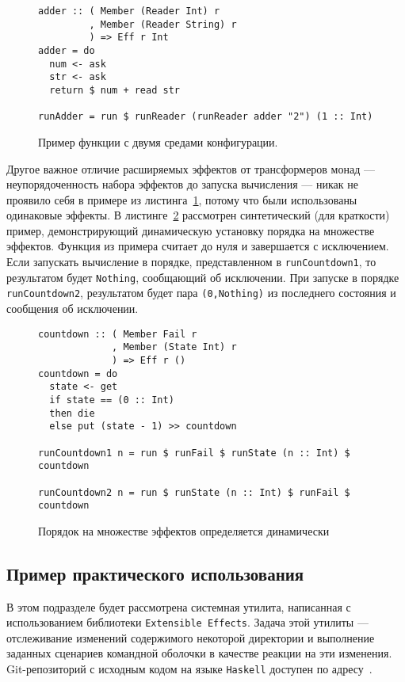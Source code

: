 \begin{figure}[t]
\begin{lstlisting}
adder :: ( Member (Reader Int) r
         , Member (Reader String) r
         ) => Eff r Int
adder = do
  num <- ask
  str <- ask
  return $ num + read str

runAdder = run $ runReader (runReader adder "2") (1 :: Int)
\end{lstlisting}
\caption{Пример функции с двумя средами конфигурации.}
\label{listing:extEff2Readers}
\end{figure}

Другое важное отличие расширяемых эффектов от трансформеров монад ---
неупорядоченность набора эффектов до запуска вычисления --- никак не проявило
себя в примере из листинга~\ref{listing:extEff2Readers}, потому что были
использованы одинаковые эффекты. В листинге~\ref{listing:extEffOrdering}
рассмотрен синтетический (для краткости) пример, демонстрирующий динамическую
установку порядка на множестве эффектов. Функция из примера считает до нуля и
завершается с исключением. Если запускать вычисление в порядке, представленном
в \lstinline{runCountdown1}, то результатом будет \lstinline{Nothing},
сообщающий об исключении. При запуске в порядке \lstinline{runCountdown2},
результатом будет пара \lstinline{(0,Nothing)} из последнего состояния и
сообщения об исключении.

\begin{figure}[t]
\begin{lstlisting}
countdown :: ( Member Fail r
             , Member (State Int) r
             ) => Eff r ()
countdown = do
  state <- get
  if state == (0 :: Int)
  then die
  else put (state - 1) >> countdown

runCountdown1 n = run $ runFail $ runState (n :: Int) $ countdown

runCountdown2 n = run $ runState (n :: Int) $ runFail $ countdown
\end{lstlisting}
\caption{Порядок на множестве эффектов определяется динамически}
\label{listing:extEffOrdering}
\end{figure}

\subsection{Пример практического использования}

В этом подразделе будет рассмотрена системная утилита,
написанная с использованием библиотеки \lstinline{Extensible Effects}.
Задача этой утилиты --- отслеживание изменений содержимого некоторой директории
и выполнение заданных сценариев командной оболочки в качестве реакции на эти
изменения. Git-репозиторий с исходным кодом на языке \lstinline{Haskell}
доступен по адресу~\cite{fileTrigger}.

